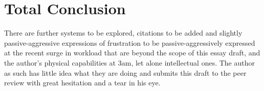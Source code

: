 \documentclass{scrartcl}
\begin{document}
\section{Total Conclusion}
There are further systems to be explored, citations to be added and slightly passive-aggressive expressions of frustration to be passive-aggressively expressed at the recent surge in workload that are beyond the scope of this essay draft, and the author's physical capabilities at 3am, let alone intellectual ones. The author as such has little idea what they are doing and submits this draft to the peer review with great hesitation and a tear in his eye.

 

\end{document}
